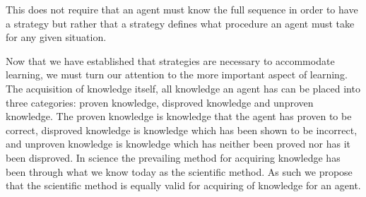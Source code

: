 \documentclass[\master/Master.tex]{subfiles}
\begin{document}
	This does not require that an agent must know the full sequence in order to have a strategy but rather that a strategy defines what procedure an agent must take for any given situation.

	Now that we have established that strategies are necessary to accommodate learning, we must turn our attention to the more important aspect of learning. 
	The acquisition of knowledge itself, all knowledge an agent has can be placed into three categories: proven knowledge, disproved knowledge and unproven knowledge. 
	The proven knowledge is knowledge that the agent has proven to be correct, disproved knowledge is knowledge which has been shown to be incorrect, and unproven knowledge is knowledge which has neither been proved nor has it been disproved.
	In science the prevailing method for acquiring knowledge has been through what we know today as the scientific method. 
	As such we propose that the scientific method is equally valid for acquiring of knowledge for an agent.
	
	
	
	
	
\end{document}
